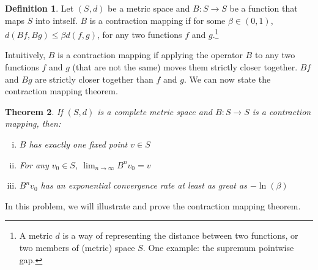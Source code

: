 \documentclass[11pt]{extarticle}
\theoremstyle{plain}
\newtheorem{thm}{Theorem}
\theoremstyle{definition}
\newtheorem{defn}[thm]{Definition}
\begin{document}
\vspace{5mm}
\begin{defn}
	
	Let $(S, d)$ be a metric space and $B: S \to S$ be a function that maps $S$ into intself. $B$ is a contraction mapping if for some $\beta \in (0, 1)$, $d(Bf, Bg) \leq \beta d(f, g)$, for any two functions $f$ and $g$.\footnote{
		A metric $d$ is a way of representing the distance between two functions, or two members of (metric) space $S$. One example: the supremum pointwise gap.
	}
	
\end{defn}


\vspace{5mm}
\noindent
Intuitively, $B$ is a contraction mapping if applying the operator $B$ to any two functions $f$ and $g$ (that are not the same) moves them strictly closer together. $Bf$ and $Bg$ are strictly closer together than $f$ and $g$. We can now state the contraction mapping theorem. 


\vspace{5mm}
\begin{thm}
	
	If $(S, d)$ is a complete metric space and $B: S \to S$ is a contraction mapping, then: 
	\begin{enumerate}[(i)]
		\item $B$ has exactly one fixed point $v \in S$
		\item For any $v_0 \in S$, $\lim_{n \to \infty} B^n v_0 = v$
		\item $B^n v_0$ has an exponential convergence rate at least as great as $- \ln(\beta)$
	\end{enumerate}
	
\end{thm}


\vspace{10mm}
\noindent
In this problem, we will illustrate and prove the contraction mapping theorem.
\end{document}
